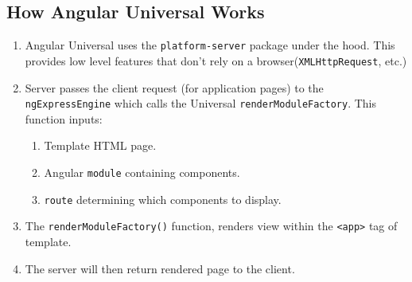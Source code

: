 \subsection{How Angular Universal Works}
\begin{enumerate}
  \item Angular Universal uses the \lstinline{platform-server} package under the hood. This provides low level features that don't rely on a browser(\lstinline{XMLHttpRequest}, etc.)
  \item Server passes the client request (for application pages) to the \lstinline{ngExpressEngine} which calls the Universal \lstinline{renderModuleFactory}. This function inputs: 
  \begin{enumerate}
    \item Template HTML page.
    \item Angular \lstinline{module} containing components.
    \item \lstinline{route} determining which components to display. 
  \end{enumerate}
  \item The \lstinline{renderModuleFactory()} function, renders view within the \lstinline{<app>} tag of template. 
  \item The server will then return rendered page to the client. 
\end{enumerate}




